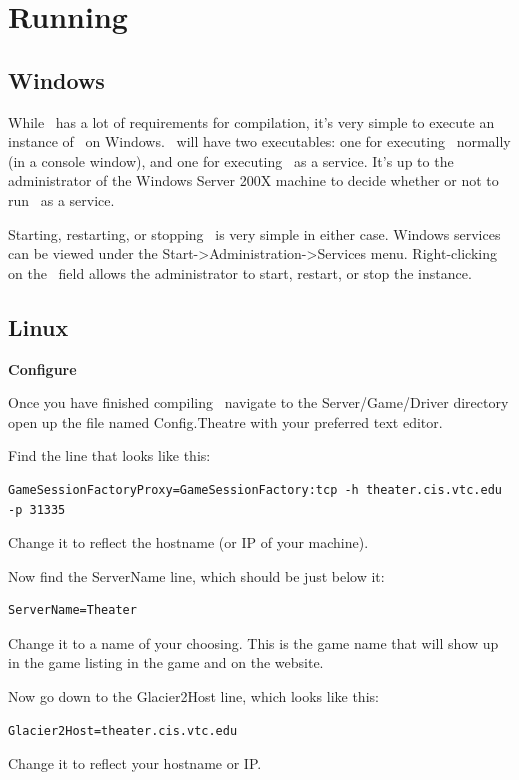 \section{Running}

\subsection{Windows}

While \GameServer\ has a lot of requirements for compilation, it's very simple to execute an instance of \GameServer\ on Windows. \GameServer\ will have two executables: one for executing \GameServer\ normally (in a console window), and one for executing \GameServer\ as a service. It's up to the administrator of the Windows Server 200X machine to decide whether or not to run \GameServer\ as a service.

Starting, restarting, or stopping \GameServer\ is very simple in either case. Windows services can be viewed under the Start->Administration->Services menu. Right-clicking on the \GameServer\ field allows the administrator to start, restart, or stop the instance.

\subsection{Linux}

\textbf{Configure \GameServer}


Once you have finished compiling \GameServer\ navigate to the Server/Game/Driver directory open up the file named Config.Theatre with your preferred text editor.

Find the line that looks like this:
\begin{verbatim}GameSessionFactoryProxy=GameSessionFactory:tcp -h theater.cis.vtc.edu -p 31335\end{verbatim}
Change it to reflect the hostname (or IP of your machine).

Now find the ServerName line, which should be just below it:
\begin{verbatim}ServerName=Theater\end{verbatim}
Change it to a name of your choosing.  This is the game name that will show up in the game listing in the game and on the website.

Now go down to the Glacier2Host line, which looks like this:
\begin{verbatim}Glacier2Host=theater.cis.vtc.edu\end{verbatim}
Change it to reflect your hostname or IP.

